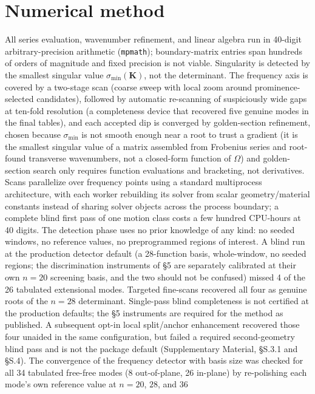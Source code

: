\documentclass[11pt]{article}
\begin{document}
\section{Numerical method}
All series evaluation, wavenumber refinement, and linear algebra run in
40-digit arbitrary-precision arithmetic (\texttt{mpmath}); boundary-matrix
entries span hundreds of orders of magnitude and fixed precision is not
viable. Singularity is detected by the smallest singular value
$\sigma_{\min}(\mathbf{K})$, not the determinant. The frequency axis
is covered by a two-stage scan (coarse sweep with local zoom around
prominence-selected candidates), followed by automatic re-scanning of
suspiciously wide gaps at ten-fold resolution (a completeness device
that recovered five genuine modes in the final tables), and each accepted
dip is converged by golden-section refinement, chosen because $\sigma_{\min}$
is not smooth enough near a root to trust a gradient (it is the smallest
singular value of a matrix assembled from Frobenius series and root-found
transverse wavenumbers, not a closed-form function of $\Omega$) and
golden-section search only requires function evaluations and bracketing,
not derivatives. Scans parallelize over
frequency points using a standard multiprocess architecture, with each
worker rebuilding its solver from scalar geometry/material constants instead of sharing solver objects across the process boundary; a
complete blind first pass of one motion class costs a few hundred
CPU-hours at 40 digits. The detection phase uses
no prior knowledge of any kind: no seeded windows, no reference values, no
preprogrammed regions of interest. A blind run at the production detector default (a 28-function basis,
whole-window, no seeded regions; the discrimination instruments of \S5 are
separately calibrated at their own $n{=}20$ screening basis, and the two
should not be confused) missed 4 of the 26 tabulated extensional modes.
Targeted fine-scans recovered all four as genuine roots of the $n=28$
determinant. Single-pass blind completeness is not certified at the
production defaults; the \S5 instruments are required for the method as
published. A subsequent opt-in local split/anchor enhancement recovered
those four unaided in the same configuration, but failed a required
second-geometry blind pass and is not the package default
(Supplementary Material, §S.3.1 and §S.4).
The convergence of the frequency detector with basis size was checked for
all 34 tabulated free-free modes (8 out-of-plane, 26 in-plane) by
re-polishing each mode's own reference value at $n=20$, $28$, and $36$
\end{document}
